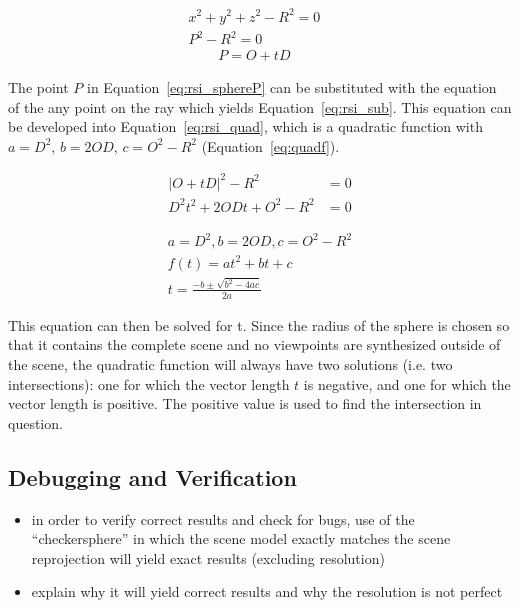 \begin{align}
  x^2 + y^2 + z^2 - R^2 = 0&\label{eq:rsi_spherefull}\\ 
  P^2 - R^2 = 0&\label{eq:rsi_sphereP}
\end{align} 
\begin{align}
  P = O + tD& \label{eq:rsi_point}
\end{align} 

The point $P$ in Equation~\ref{eq:rsi_sphereP} can be substituted with the equation of the any point on the ray which yields Equation~\ref{eq:rsi_sub}. This equation can be developed into Equation~\ref{eq:rsi_quad}, which is a quadratic function with $a = D^2$, $b = 2OD$, $c = O^2-R^2$ (Equation~\ref{eq:quadf}).

\begin{align}
  |O + tD|^2 - R^2 &= 0  \label{eq:rsi_sub}\\
  D^2 t^2 + 2ODt + O^2 - R^2 &= 0 \label{eq:rsi_quad}
\end{align}

\begin{align}
  a = D^2, b = 2OD, c = O^2-R^2 \\
  f(t) = at^2 + bt + c \label{eq:quadf}\\
  t = \frac{-b \pm \sqrt{b^2 - 4ac}}{2a} \label{eq:solvequadf}
\end{align}

This equation can then be solved for t. Since the radius of the sphere is chosen so that it contains the complete scene and no viewpoints are synthesized outside of the scene, the quadratic function will always have two solutions (i.e. two intersections): one for which the vector length $t$ is negative, and one for which the vector length is positive. The positive value is used to find the intersection in question.

\subsection{Debugging and Verification}
\begin{itemize}
  \item in order to verify correct results and check for bugs, use of the ``checkersphere'' in which the scene model exactly matches the scene \ar reprojection will yield exact results (excluding resolution)
  \item explain why it will yield correct results and why the resolution is not perfect
\end{itemize}

